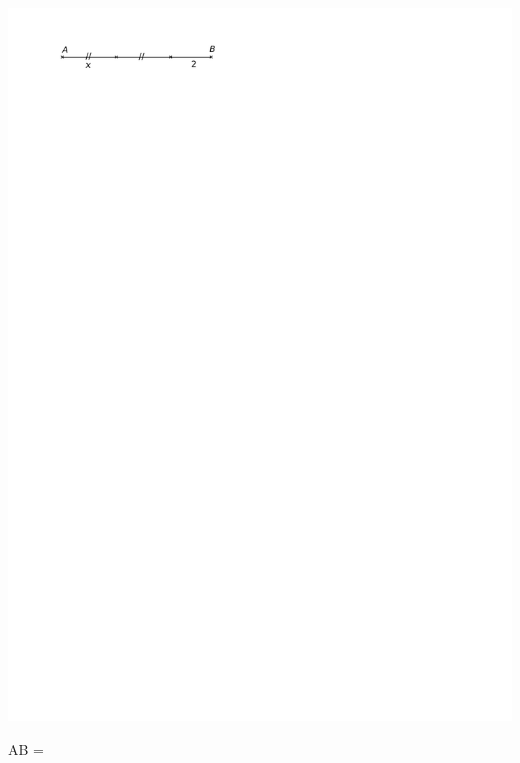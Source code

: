 \documentclass[a4paper,11pt]{report}
\begin{document}
\begin{exop}
{\begin{tasks}
     \includegraphics[scale=1.1]{media/fa-10/ligne2.pdf}

AB = \hrulefill

  \task 
  

\end{tasks}}
\end{exop}
\end{document}

